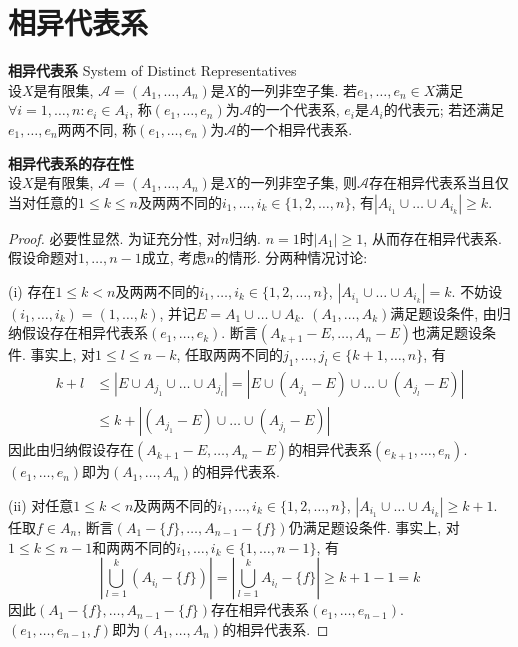 
\section{相异代表系}

\begin{dfn}\textbf{相异代表系} System of Distinct Representatives\\
设$X$是有限集, $\mathcal{A}=(A_1,\dots, A_n)$是$X$的一列非空子集. 若$e_1,\dots,e_n\in X$满足$\forall i=1,\dots,n: e_i \in A_i$, 称$(e_1,\dots,e_n)$为$\mathcal{A}$的一个代表系, $e_i$是$A_i$的代表元; 若还满足$e_1,\dots,e_n$两两不同, 称$(e_1,\dots,e_n)$为$\mathcal{A}$的一个相异代表系.
\end{dfn}

\begin{thm}\textbf{相异代表系的存在性}\\
设$X$是有限集, $\mathcal{A}=(A_1,\dots, A_n)$是$X$的一列非空子集, 则$\mathcal{A}$存在相异代表系当且仅当对任意的$1\le k\le n$及两两不同的$i_1,\dots,i_k \in \{1,2,\dots,n\}$, 有$|A_{i_1} \cup \dots \cup A_{i_k}| \ge k$. 
\label{thm:sdr_exists}
\end{thm}
\begin{proof}
必要性显然. 为证充分性, 对$n$归纳. $n=1$时$|A_1|\ge 1$, 从而存在相异代表系. 假设命题对$1,\dots,n-1$成立, 考虑$n$的情形. 分两种情况讨论:

(i) 存在$1\le k < n$及两两不同的$i_1,\dots,i_k \in \{1,2,\dots,n\}$, $|A_{i_1} \cup \dots \cup A_{i_k}| = k$. 不妨设$(i_1,\dots,i_k) = (1,\dots,k)$, 并记$E=A_1\cup \dots \cup A_k$. $(A_1,\dots, A_k)$满足题设条件, 由归纳假设存在相异代表系$(e_1,\dots,e_k)$. 断言$(A_{k+1}-E,\dots, A_{n}-E)$也满足题设条件. 事实上, 对$1\le l\le n-k$, 任取两两不同的$j_1,\dots,j_l \in \{k+1,\dots, n\}$, 有
\begin{align*}
k+l &\le |E \cup A_{j_1} \cup \dots \cup A_{j_l}| = |E \cup (A_{j_1}-E) \cup \dots \cup (A_{j_l}-E)| \\
& \le  k + |(A_{j_1}-E) \cup \dots \cup (A_{j_l}-E)|
\end{align*}
因此由归纳假设存在$(A_{k+1}-E,\dots, A_{n}-E)$的相异代表系$(e_{k+1},\dots,e_n)$. $(e_1,\dots, e_n)$即为$(A_1,\dots, A_n)$的相异代表系. 

(ii) 对任意$1\le k < n$及两两不同的$i_1,\dots,i_k \in \{1,2,\dots,n\}$, $|A_{i_1} \cup \dots \cup A_{i_k}| \ge k+1$. 任取$f\in A_n$, 断言$(A_1-\{f\}, \dots, A_{n-1}-\{f\})$仍满足题设条件. 事实上, 对$1\le k\le n-1$和两两不同的$i_1,\dots,i_k \in \{1,\dots, n-1\}$, 有
\begin{equation}
    \left|\bigcup_{l=1}^k (A_{i_l} - \{f\}) \right|= \left| \bigcup_{l=1}^k A_{i_l} - \{f\} \right|\ge k + 1 - 1 = k
\end{equation}
因此$(A_1-\{f\}, \dots, A_{n-1}-\{f\})$存在相异代表系$(e_1,\dots,e_{n-1})$. $(e_1,\dots, e_{n-1}, f)$即为$(A_1,\dots, A_n)$的相异代表系. 
\end{proof}

